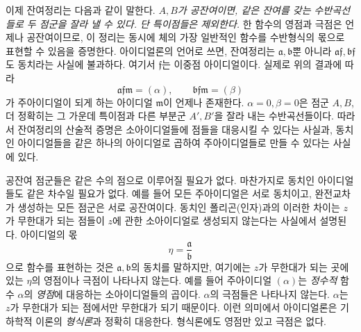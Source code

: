 이제 잔여정리는 다음과 같이 말한다. \emph{\(A,B\)가 공잔여이면, 같은 잔여를 갖는 수반곡선들로 두 점군을 잘라 낼 수 있다. 단 특이점들은 제외한다.} 한 함수의 영점과 극점은 언제나 공잔여이므로, 이 정리는 동시에 체의 가장 일반적인 함수를 수반형식의 몫으로 표현할 수 있음을 증명한다. 아이디얼론의 언어로 쓰면, 잔여정리는 \(\mathfrak a,\mathfrak b\)뿐 아니라 \(\mathfrak a\mathfrak f,\mathfrak b\mathfrak f\)도 동치라는 사실에 불과하다. 여기서 \(\mathfrak f\)는 이중점 아이디얼이다. 실제로 위의 결과에 따라
\[
\mathfrak a\mathfrak f\mathfrak m=(\alpha),\qquad
\mathfrak b\mathfrak f\mathfrak m=(\beta)
\]
가 주아이디얼이 되게 하는 아이디얼 \(\mathfrak m\)이 언제나 존재한다. \(\alpha=0,\beta=0\)은 점군 \(A,B\), 더 정확히는 그 가운데 특이점과 다른 부분군 \(A',B'\)을 잘라 내는 수반곡선들이다. 따라서 잔여정리의 산술적 증명은 소아이디얼들에 점들을 대응시킬 수 있다는 사실과, 동치인 아이디얼들을 같은 하나의 아이디얼로 곱하여 주아이디얼들로 만들 수 있다는 사실에 있다.

공잔여 점군들은 같은 수의 점으로 이루어질 필요가 없다. 마찬가지로 동치인 아이디얼들도 같은 차수일 필요가 없다. 예를 들어 모든 주아이디얼은 서로 동치이고, 완전교차가 생성하는 모든 점군은 서로 공잔여이다. 동치인 폴리곤(인자)과의 이러한 차이는 \(z\)가 무한대가 되는 점들이 \(z\)에 관한 소아이디얼로 생성되지 않는다는 사실에서 설명된다. 아이디얼의 몫
\[
\eta=\frac{\mathfrak a}{\mathfrak b}
\]
으로 함수를 표현하는 것은 \(\mathfrak a,\mathfrak b\)의 동치를 말하지만, 여기에는 \(z\)가 무한대가 되는 곳에 있는 \(\eta\)의 영점이나 극점이 나타나지 않는다. 예를 들어 주아이디얼 \((\alpha)\)는 \emph{정수적} 함수 \(\alpha\)의 \emph{영점}에 대응하는 소아이디얼들의 곱이다. \(\alpha\)의 극점들은 나타나지 않는다. \(\alpha\)는 \(z\)가 무한대가 되는 점에서만 무한대가 되기 때문이다. 이런 의미에서 아이디얼론은 기하학적 이론의 \emph{형식론}과 정확히 대응한다. 형식론에도 영점만 있고 극점은 없다.

